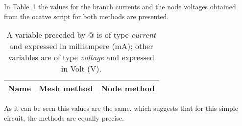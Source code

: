 In Table~\ref{tab:theoretical} the values for the branch currents and the node voltages obtained from the ocatve script for both methods are presented.\par 
\begin{table}[h]
  \centering
  \begin{tabular}{|l|r|r|}
    \hline    
    {\bf Name} & {\bf Mesh method} & {\bf Node method}\\ \hline
    
  \end{tabular}
  \caption{A variable preceded by @ is of type {\em current}
    and expressed in milliampere (mA); other variables are of type {\it voltage} and expressed in
    Volt (V).}
  \label{tab:theoretical}
\end{table}

As it can be seen this values are the same, which suggests that for this simple circuit, the methods are equally precise. 
